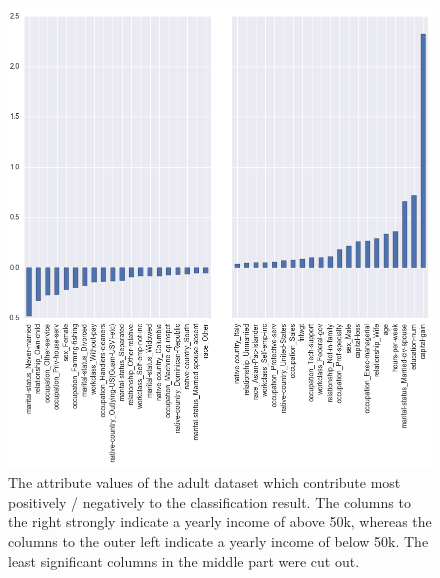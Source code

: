 \documentclass{llncs}
\begin{document}


\begin{figure}[!t]
	\begin{center}
		\vspace{-1.0cm}
    	\hspace*{-0.8cm}
		\includegraphics[width=1.1\textwidth]{figures/experiment/important_columns_cut}
		\caption{The attribute values of the adult dataset which contribute most positively / negatively to the classification result. The columns to the right strongly indicate a yearly income of above 50k, whereas the columns to the outer left indicate a yearly income of below 50k. The least significant columns in the middle part were cut out.}
		\label{fig:adult_important_columns}
	\end{center}
\end{figure}
\end{document}
